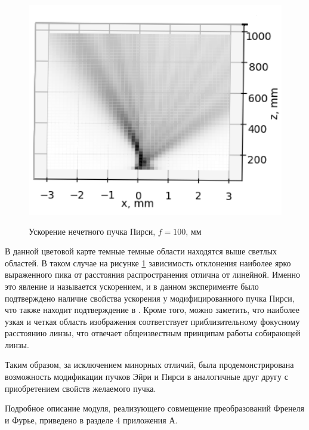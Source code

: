 {	\begin{figure}[H]
	\centering
\includegraphics[height = 10cm]{plots/pe_acc_before_focus.png}
\caption{Ускорение нечетного пучка Пирси, $f = 100$, мм}
	\label{correct_acc_peodd}
\end{figure}

 В данной цветовой карте темные темные области находятся выше светлых областей. В таком случае на рисунке \ref{correct_acc_peodd} зависимость отклонения наиболее ярко выраженного пика от расстояния распространения отлична от линейной. Именно это явление и называется ускорением, и в данном эксперименте было подтверждено наличие свойства ускорения у модифицированного пучка Пирси, что также находит подтверждение в \cite{first_airy}.  Кроме того, можно заметить, что наиболее узкая и четкая область изображения соответствует приблизительному фокусному расстоянию линзы, что отвечает общеизвестным принципам работы собирающей линзы. 
 
 Таким образом, за исключением минорных отличий,  была продемонстрирована возможность модификации пучков Эйри и Пирси в аналогичные друг другу с приобретением свойств желаемого пучка.
 
 Подробное описание модуля, реализующего совмещение преобразований Френеля и Фурье, приведено в разделе 4 приложения А.
	
	}
	\newpage
